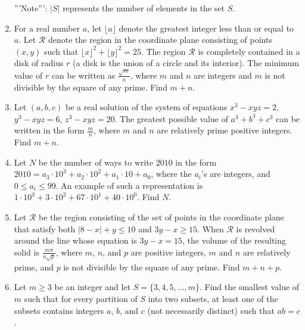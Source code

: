 \documentclass{article}
\begin{document}
\begin{enumerate}[label=\arabic*., itemsep=0.5em]
'''Note''': $|S|$ represents the number of elements in the set $S$.\par \vspace{0.5em}\item For a real number $a$, let $\lfloor a \rfloor$ denote the greatest integer less than or equal to $a$. Let $\mathcal{R}$ denote the region in the coordinate plane consisting of points $(x,y)$ such that $\lfloor x \rfloor ^2 + \lfloor y \rfloor ^2 = 25$. The region $\mathcal{R}$ is completely contained in a disk of radius $r$ (a disk is the union of a circle and its interior). The minimum value of $r$ can be written as $\frac {\sqrt {m}}{n}$, where $m$ and $n$ are integers and $m$ is not divisible by the square of any prime. Find $m + n$.\par \vspace{0.5em}\item Let $(a,b,c)$ be a real solution of the system of equations $x^3 - xyz = 2$, $y^3 - xyz = 6$, $z^3 - xyz = 20$. The greatest possible value of $a^3 + b^3 + c^3$ can be written in the form $\frac {m}{n}$, where $m$ and $n$ are relatively prime positive integers. Find $m + n$.\par \vspace{0.5em}\item Let $N$ be the number of ways to write $2010$ in the form $2010 = a_3 \cdot 10^3 + a_2 \cdot 10^2 + a_1 \cdot 10 + a_0$, where the $a_i$'s are integers, and $0 \le a_i \le 99$. An example of such a representation is $1\cdot 10^3 + 3\cdot 10^2 + 67\cdot 10^1 + 40\cdot 10^0$. Find $N$.\par \vspace{0.5em}\item Let $\mathcal{R}$ be the region consisting of the set of points in the coordinate plane that satisfy both $|8 - x| + y \le 10$ and $3y - x \ge 15$. When $\mathcal{R}$ is revolved around the line whose equation is $3y - x = 15$, the volume of the resulting solid is $\frac {m\pi}{n\sqrt {p}}$, where $m$, $n$, and $p$ are positive integers, $m$ and $n$ are relatively prime, and $p$ is not divisible by the square of any prime. Find $m + n + p$.\par \vspace{0.5em}\item Let $m \ge 3$ be an integer and let $S = \{3,4,5,\ldots,m\}$. Find the smallest value of $m$ such that for every partition of $S$ into two subsets, at least one of the subsets contains integers $a$, $b$, and $c$ (not necessarily distinct) such that $ab = c$.


\end{enumerate}
\end{document}
